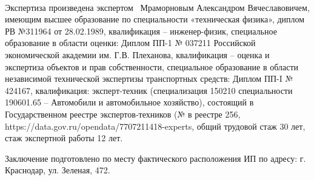 \paragraph*{}
Экспертиза произведена  экспертом
\,  Мраморновым Александром Вячеславовичем, имеющим высшее  образование по специальности «техническая физика», диплом РВ №311964 от 28.02.1989, квалификация -- инженер-физик, специальное образование в области оценки: Диплом ПП-1 № 037211 Российской экономической академии им. Г.В. Плеханова, квалификация -- оценка и экспертиза объектов и прав собственности, специальное образование в области независимой технической экспертизы транспортных средств: Диплом ПП-I № 424167, квалификация: эксперт-техник (специализация 150210 специальности 190601.65 – Автомобили и автомобильное хозяйство), состоящий в Государственном реестре экспертов-техников (№ в реестре 256, https://data.gov.ru/opendata/7707211418-experts,  общий трудовой  стаж 30 лет, стаж  экспертной работы  12 лет. 
\par Заключение подготовлено по месту фактического расположения ИП по адресу: г. Краснодар, 
ул. Зеленая, 472.
